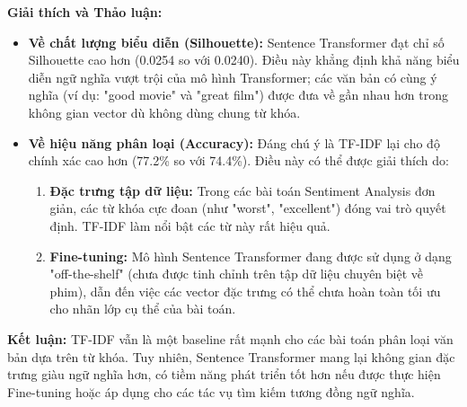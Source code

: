 \documentclass[12pt,a4paper]{article}
\begin{document}
\textbf{Giải thích và Thảo luận:}
\begin{itemize}
    \item \textbf{Về chất lượng biểu diễn (Silhouette):} Sentence Transformer đạt chỉ số Silhouette cao hơn (0.0254 so với 0.0240). Điều này khẳng định khả năng biểu diễn ngữ nghĩa vượt trội của mô hình Transformer; các văn bản có cùng ý nghĩa (ví dụ: "good movie" và "great film") được đưa về gần nhau hơn trong không gian vector dù không dùng chung từ khóa.
    \item \textbf{Về hiệu năng phân loại (Accuracy):} Đáng chú ý là TF-IDF lại cho độ chính xác cao hơn (77.2\% so với 74.4\%). Điều này có thể được giải thích do:
    \begin{enumerate}
        \item \textbf{Đặc trưng tập dữ liệu:} Trong các bài toán Sentiment Analysis đơn giản, các từ khóa cực đoan (như "worst", "excellent") đóng vai trò quyết định. TF-IDF làm nổi bật các từ này rất hiệu quả.
        \item \textbf{Fine-tuning:} Mô hình Sentence Transformer đang được sử dụng ở dạng "off-the-shelf" (chưa được tinh chỉnh trên tập dữ liệu chuyên biệt về phim), dẫn đến việc các vector đặc trưng có thể chưa hoàn toàn tối ưu cho nhãn lớp cụ thể của bài toán.
    \end{enumerate}
\end{itemize}

\textbf{Kết luận:} TF-IDF vẫn là một baseline rất mạnh cho các bài toán phân loại văn bản dựa trên từ khóa. Tuy nhiên, Sentence Transformer mang lại không gian đặc trưng giàu ngữ nghĩa hơn, có tiềm năng phát triển tốt hơn nếu được thực hiện Fine-tuning hoặc áp dụng cho các tác vụ tìm kiếm tương đồng ngữ nghĩa.
\end{document}
